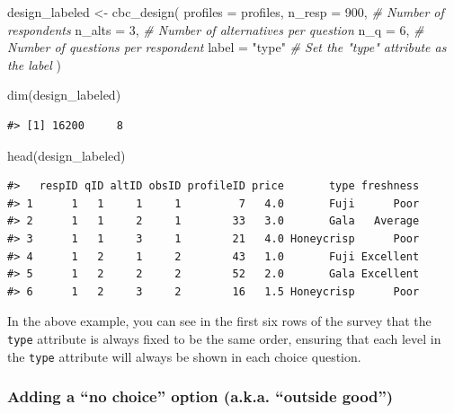 \documentclass[
  12pt,
]{article}
\newenvironment{Shaded}{\begin{snugshade}}{\end{snugshade}}
\newcommand{\AttributeTok}[1]{\textcolor[rgb]{0.77,0.63,0.00}{#1}}
\newcommand{\CommentTok}[1]{\textcolor[rgb]{0.56,0.35,0.01}{\textit{#1}}}
\newcommand{\DecValTok}[1]{\textcolor[rgb]{0.00,0.00,0.81}{#1}}
\newcommand{\FunctionTok}[1]{\textcolor[rgb]{0.00,0.00,0.00}{#1}}
\newcommand{\NormalTok}[1]{#1}
\newcommand{\OtherTok}[1]{\textcolor[rgb]{0.56,0.35,0.01}{#1}}
\newcommand{\StringTok}[1]{\textcolor[rgb]{0.31,0.60,0.02}{#1}}
\begin{document}
\begin{Shaded}
\begin{Highlighting}[]
\NormalTok{design\_labeled }\OtherTok{\textless{}{-}} \FunctionTok{cbc\_design}\NormalTok{(}
  \AttributeTok{profiles  =}\NormalTok{ profiles,}
  \AttributeTok{n\_resp    =} \DecValTok{900}\NormalTok{, }\CommentTok{\# Number of respondents}
  \AttributeTok{n\_alts    =} \DecValTok{3}\NormalTok{,   }\CommentTok{\# Number of alternatives per question}
  \AttributeTok{n\_q       =} \DecValTok{6}\NormalTok{,   }\CommentTok{\# Number of questions per respondent}
  \AttributeTok{label     =} \StringTok{"type"} \CommentTok{\# Set the "type" attribute as the label}
\NormalTok{)}

\FunctionTok{dim}\NormalTok{(design\_labeled)}
\end{Highlighting}
\end{Shaded}

\begin{verbatim}
#> [1] 16200     8
\end{verbatim}

\begin{Shaded}
\begin{Highlighting}[]
\FunctionTok{head}\NormalTok{(design\_labeled)}
\end{Highlighting}
\end{Shaded}

\begin{verbatim}
#>   respID qID altID obsID profileID price       type freshness
#> 1      1   1     1     1         7   4.0       Fuji      Poor
#> 2      1   1     2     1        33   3.0       Gala   Average
#> 3      1   1     3     1        21   4.0 Honeycrisp      Poor
#> 4      1   2     1     2        43   1.0       Fuji Excellent
#> 5      1   2     2     2        52   2.0       Gala Excellent
#> 6      1   2     3     2        16   1.5 Honeycrisp      Poor
\end{verbatim}

In the above example, you can see in the first six rows of the survey
that the \texttt{type} attribute is always fixed to be the same order,
ensuring that each level in the \texttt{type} attribute will always be
shown in each choice question.

\hypertarget{adding-a-no-choice-option-a.k.a.-outside-good}{%
\subsubsection{Adding a ``no choice'' option (a.k.a. ``outside
good'')}\label{adding-a-no-choice-option-a.k.a.-outside-good}}
\end{document}
